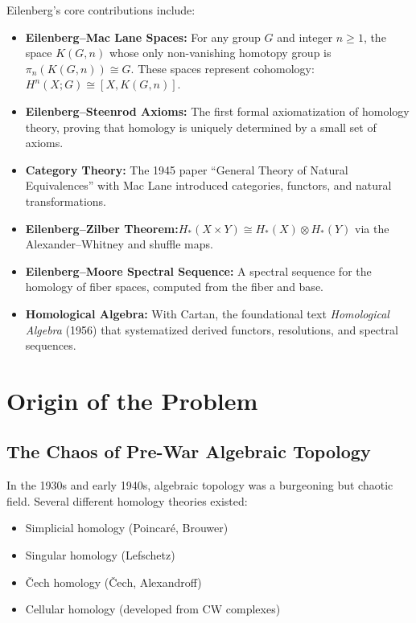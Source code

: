Eilenberg's core contributions include:
\begin{itemize}
    \item \textbf{Eilenberg--Mac Lane Spaces:} For any group $G$ and integer $n \geq 1$, the space $K(G,n)$ whose only non-vanishing homotopy group is $\pi_n(K(G,n)) \cong G$. These spaces represent cohomology: $H^n(X; G) \cong [X, K(G,n)]$.
    \item \textbf{Eilenberg--Steenrod Axioms:} The first formal axiomatization of homology theory, proving that homology is uniquely determined by a small set of axioms.
    \item \textbf{Category Theory:} The 1945 paper ``General Theory of Natural Equivalences'' with Mac Lane introduced categories, functors, and natural transformations.
    \item \textbf{Eilenberg--Zilber Theorem:}$H_*(X \times Y) \cong H_*(X) \otimes H_*(Y)$ via the Alexander--Whitney and shuffle maps.
    \item \textbf{Eilenberg--Moore Spectral Sequence:} A spectral sequence for the homology of fiber spaces, computed from the fiber and base.
    \item \textbf{Homological Algebra:} With Cartan, the foundational text \textit{Homological Algebra} (1956) that systematized derived functors, resolutions, and spectral sequences.
\end{itemize}

\section{Origin of the Problem}

\subsection{The Chaos of Pre-War Algebraic Topology}

In the 1930s and early 1940s, algebraic topology was a burgeoning but chaotic field. Several different homology theories existed:
\begin{itemize}
    \item Simplicial homology (Poincar\'e, Brouwer)
    \item Singular homology (Lefschetz)
    \item \v{C}ech homology (\v{C}ech, Alexandroff)
    \item Cellular homology (developed from CW complexes)
\end{itemize}

